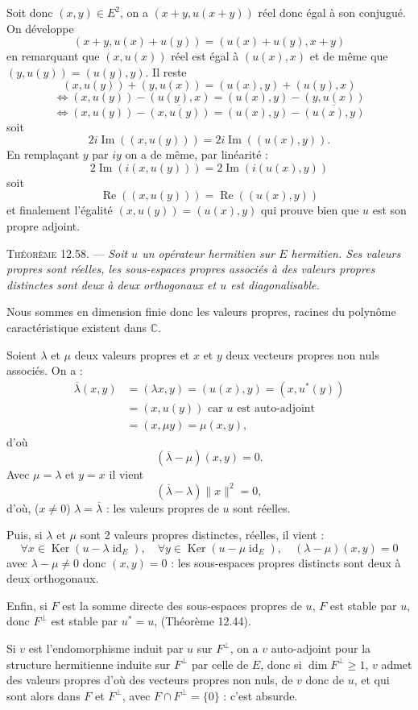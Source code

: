 Soit donc $(x,y)\in E^2$, on a $(x+y,u(x+y))$ réel donc égal à son conjugué. On développe
\[
(x+y,u(x)+u(y))=(u(x)+u(y),x+y)
\]
en remarquant que $(x,u(x))$ réel est égal à $(u(x),x)$ et de même que $(y,u(y))=(u(y),y)$. Il reste
\[
(x,u(y))+(y,u(x))=(u(x),y)+(u(y),x)
\]
\[
\Longleftrightarrow (x,u(y))-(u(y),x)=(u(x),y)-(y,u(x))
\]
\[
\Longleftrightarrow (x,u(y))-\overline{(x,u(y))}=(u(x),y)-\overline{(u(x),y)}
\]
soit
\[
2i\operatorname{Im}((x,u(y)))=2i\operatorname{Im}((u(x),y)).
\]
En remplaçant $y$ par $iy$ on a de même, par linéarité :
\[
2\operatorname{Im}(i(x,u(y)))=2\operatorname{Im}(i(u(x),y))
\]
soit
\[
\operatorname{Re}((x,u(y)))=\operatorname{Re}((u(x),y))
\]
et finalement l'égalité $(x,u(y))=(u(x),y)$ qui prouve bien que $u$ est son propre adjoint. \bookend

\medskip\noindent\textsc{Théorème 12.58.} --- \emph{Soit $u$ un opérateur hermitien sur $E$ hermitien. Ses valeurs propres sont réelles, les sous-espaces propres associés à des valeurs propres distinctes sont deux à deux orthogonaux et $u$ est diagonalisable.}

Nous sommes en dimension finie donc les valeurs propres, racines du polynôme caractéristique existent dans $\mathbb C$.

Soient $\lambda$ et $\mu$ deux valeurs propres et $x$ et $y$ deux vecteurs propres non nuls associés. On a :
\begin{align*}
\overline\lambda(x,y)&=(\lambda x,y)=(u(x),y)=(x,u^*(y))\\
&=(x,u(y))\text{ car $u$ est auto-adjoint}\\
&=(x,\mu y)=\mu(x,y),
\end{align*}
d'où
\[
(\overline\lambda-\mu)(x,y)=0.
\]
Avec $\mu=\lambda$ et $y=x$ il vient
\[
(\overline\lambda-\lambda)\|x\|^2=0,
\]
d'où, ($x\ne0$) $\lambda=\overline\lambda$ : les valeurs propres de $u$ sont réelles.

Puis, si $\lambda$ et $\mu$ sont 2 valeurs propres distinctes, réelles, il vient :
\[
\forall x\in\operatorname{Ker}(u-\lambda\operatorname{id}_E),\quad
\forall y\in\operatorname{Ker}(u-\mu\operatorname{id}_E),\quad
(\lambda-\mu)(x,y)=0
\]
avec $\lambda-\mu\ne0$ donc $(x,y)=0$ : les sous-espaces propres distincts sont deux à deux orthogonaux.

Enfin, si $F$ est la somme directe des sous-espaces propres de $u$, $F$ est stable par $u$, donc $F^\perp$ est stable par $u^*=u$, (Théorème 12.44).

Si $v$ est l'endomorphisme induit par $u$ sur $F^\perp$, on a $v$ auto-adjoint pour la structure hermitienne induite sur $F^\perp$ par celle de $E$, donc si $\dim F^\perp\ge1$, $v$ admet des valeurs propres d'où des vecteurs propres non nuls, de $v$ donc de $u$, et qui sont alors dans $F$ et $F^\perp$, avec $F\cap F^\perp=\{0\}$ : c'est absurde.

